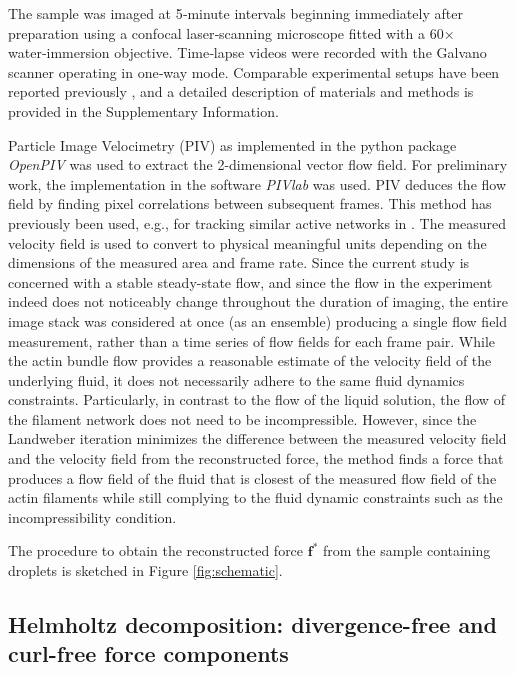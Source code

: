 \documentclass[final,leqno]{scrarticle}
\begin{document}
The sample was imaged at 5‑minute intervals beginning immediately after preparation using a confocal laser‑scanning microscope fitted with a 60× water‑immersion objective. Time‑lapse videos were recorded with the Galvano scanner operating in one‑way mode. Comparable experimental setups have been reported previously \cite{Zhang2023,Shimane2022,Pautot2003}, and a detailed description of materials and methods is provided in the Supplementary Information.


Particle Image Velocimetry (PIV) as implemented in the python package \emph{OpenPIV} \cite{alex_liberzon_2020_3930343} was used to extract the 2-dimensional vector flow field.
For preliminary work, the implementation in the software \emph{PIVlab} \cite{Thielicke_2021} was used. PIV deduces the flow field by finding pixel correlations between subsequent frames. This method has previously been used, e.g., for tracking similar active networks in \cite{Sanchez12}. The measured velocity field is used to convert to physical meaningful units depending on the dimensions of the measured area and frame rate.
Since the current study is concerned with a stable steady-state flow, and since the flow in the experiment indeed does not noticeably change throughout the duration of imaging, the entire image stack was considered at once (as an ensemble) producing a single flow field measurement, rather than a time series of flow fields for each frame pair. 
While the actin bundle flow provides a reasonable estimate of the velocity field of the underlying fluid, it does not necessarily adhere to the same fluid dynamics constraints. Particularly, in contrast to the flow of the liquid solution, the flow of the filament network does not need to be incompressible.
However, since the Landweber iteration minimizes the difference between the measured velocity field and the velocity field from the reconstructed force, the method finds a force that produces a flow field of the fluid that is closest of the measured flow field of the actin filaments while still complying to the fluid dynamic constraints such as the incompressibility condition. 

The procedure to obtain the reconstructed force $\mathbf{f}^*$ from the sample containing droplets is sketched in Figure \ref{fig:schematic}.

\subsection{Helmholtz decomposition: divergence-free and curl-free force components \label{sec:helmholtz}}
\end{document}
